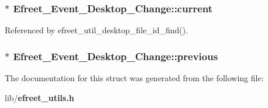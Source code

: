 \subsubsection[current]{$\ast$ {\bf Efreet\_\-Event\_\-Desktop\_\-Change::current}}\label{structEfreet__Event__Desktop__Change_1732552da742db3e07b759bc88adf2e6}




Referenced by efreet\_\-util\_\-desktop\_\-file\_\-id\_\-find().
\subsubsection[previous]{$\ast$ {\bf Efreet\_\-Event\_\-Desktop\_\-Change::previous}}\label{structEfreet__Event__Desktop__Change_aae7a44a892edd70b5bc26cd19beced9}




The documentation for this struct was generated from the following file:\begin{CompactItemize}
\item 
lib/{\bf efreet\_\-utils.h}\end{CompactItemize}

